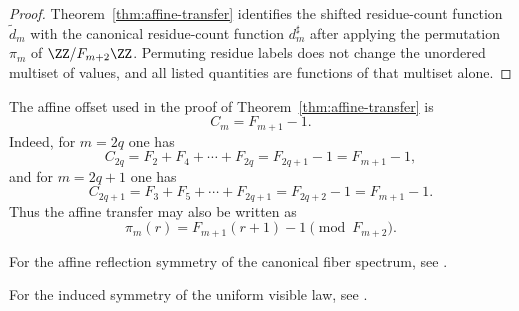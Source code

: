 \begin{proof}
Theorem~\ref{thm:affine-transfer} identifies the shifted residue-count
function $\widetilde d_m$ with the canonical residue-count function
$d_m^\sharp$ after applying the permutation $\pi_m$ of
$\ZZ/F_{m+2}\ZZ$.  Permuting residue labels does not change the unordered
multiset of values, and all listed quantities are functions of that multiset
alone.
\end{proof}

\begin{remark}
The affine offset used in the proof of Theorem~\ref{thm:affine-transfer} is
\[
C_m=F_{m+1}-1.
\]
Indeed, for $m=2q$ one has
\[
C_{2q}=F_2+F_4+\cdots+F_{2q}=F_{2q+1}-1=F_{m+1}-1,
\]
and for $m=2q+1$ one has
\[
C_{2q+1}=F_3+F_5+\cdots+F_{2q+1}=F_{2q+2}-1=F_{m+1}-1.
\]
Thus the affine transfer may also be written as
\[
\pi_m(r)=F_{m+1}(r+1)-1 \pmod{F_{m+2}}.
\]
\end{remark}

\begin{proposition}\label{prop:fiber-reflection}
For the affine reflection symmetry of the canonical fiber spectrum, see
\cite[Proposition~3.8]{MaZhang2026Nonlinearity}.
\end{proposition}

\begin{corollary}\label{cor:uniform-visible-symmetry}
For the induced symmetry of the uniform visible law, see
\cite[Corollary~3.9]{MaZhang2026Nonlinearity}.
\end{corollary}
